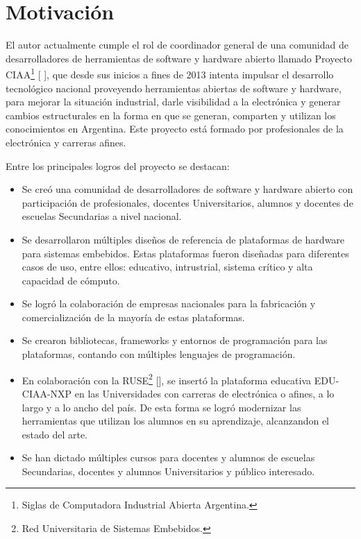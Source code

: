 \section{Motivación}
\label{sec:motivacion}

El autor actualmente cumple el rol de coordinador general de una comunidad de desarrolladores de herramientas de software y hardware abierto llamado Proyecto CIAA\footnote{Siglas de Computadora Industrial Abierta Argentina.} [ ], que desde sus inicios a fines de 2013 intenta impulsar el desarrollo tecnológico nacional proveyendo herramientas abiertas de software y hardware, para mejorar la situación industrial, darle visibilidad a la electrónica y generar cambios estructurales en la forma en que se generan, comparten y utilizan los conocimientos en Argentina. Este proyecto está formado por profesionales de la electrónica y carreras afines.

Entre los principales logros del proyecto se destacan:

\begin{itemize}
\item
Se creó una comunidad de desarrolladores de software y hardware abierto con participación de profesionales, docentes Universitarios, alumnos y docentes de escuelas Secundarias a nivel nacional.
\item
Se desarrollaron múltiples diseños de referencia de plataformas de hardware para sistemas embebidos. Estas plataformas fueron diseñadas para diferentes casos de uso, entre ellos: educativo, intrustrial, sistema crítico y alta capacidad de cómputo.
\item
Se logró la colaboración de empresas nacionales para la fabricación y comercialización de la mayoría de estas plataformas.
\item
Se crearon bibliotecas, frameworks y entornos de programación para las plataformas, contando con múltiples lenguajes de programación.
\item
En colaboración con la RUSE\footnote{Red Universitaria de Sistemas Embebidos.} [], se insertó la plataforma educativa EDU-CIAA-NXP en las Universidades con carreras de electrónica o afines, a lo largo y a lo ancho del país. De esta forma se logró modernizar las herramientas que utilizan los alumnos en su aprendizaje, alcanzandon el estado del arte.
\item
Se han dictado múltiples cursos para docentes y alumnos de escuelas Secundarias, docentes y alumnos Universitarios y público interesado.
\end{itemize}

